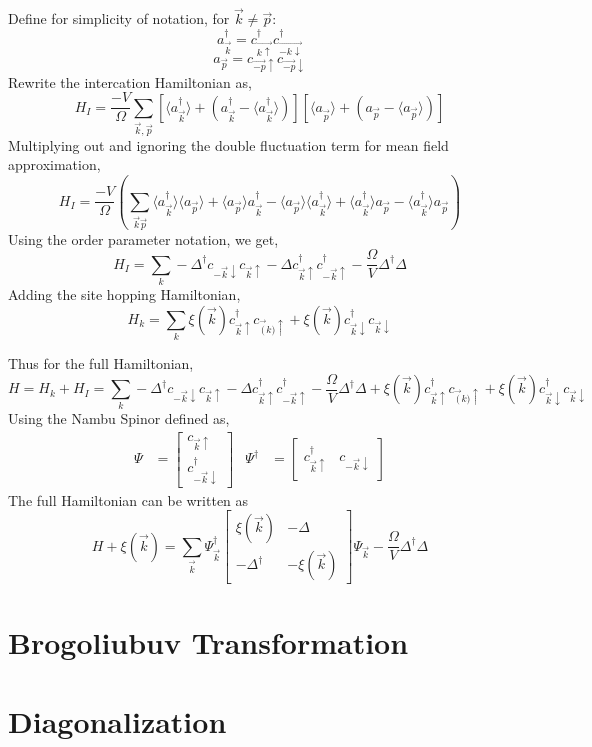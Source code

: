 \documentclass{article}
\begin{document}
Define for simplicity of notation, for $ \vec{k} \neq \vec{p}$:
 $$ a^{\dagger}_{\vec{k}} = c^{\dagger}_{\vec{k \uparrow}} c^{\dagger}_{\vec{-k \downarrow}}$$
 $$ a_{\vec{p}} = c_{\vec{-p}\uparrow}c_{\vec{-p}\downarrow}$$
Rewrite the intercation Hamiltonian as,
$$H_I = \frac{-V}{\Omega} \sum_{\vec{k}, \vec{p}}
  \left [ \langle a^{\dagger}_{\vec{k}} \rangle +
   \left( a^{\dagger}_{\vec{k}} - \langle a^{\dagger}_{\vec{k}} \rangle \right) \right]
  \left [ \langle a^{}_{\vec{p}} \rangle +
    \left( a_{\vec{p}} - \langle a_{\vec{p}} \rangle \right) \right ]
  $$
Multiplying out and ignoring the double fluctuation term for mean field approximation,
$$H_I = \frac{-V}{\Omega} \left(
  \sum_{\vec{k}\vec{p}}
    \langle a^{\dagger}_{\vec{k}}\rangle \langle a_{\vec{p}} \rangle +
      \langle   a_{\vec{p}}\rangle a^{\dagger}_{\vec{k}} -
        \langle  a_{\vec{p}}\rangle \langle a^{\dagger}_{\vec{k}} \rangle +
          \langle a^{\dagger}_{\vec{k}}\rangle a_{\vec{p}}-
           \langle a^{\dagger}_{\vec{k}}\rangle a_{\vec{p}}
\right)
$$
Using the order parameter notation, we get,
$$ H_I = \sum_{k} -\Delta^{\dagger}c_{-\vec{k}\downarrow}c_{\vec{k}\uparrow}
        -\Delta c^{\dagger}_{\vec{k}\uparrow}c^{\dagger}_{-\vec{k}\uparrow}
        -\frac{\Omega}{V}\Delta^{\dagger}\Delta
$$
Adding the site hopping Hamiltonian,
$$ H_k = \sum_{k} \xi(\vec{k})c^{\dagger}_{\vec{k}\uparrow}c_{\vec(k)\uparrow} +
\xi(\vec{k})c^{\dagger}_{\vec{k} \downarrow}c_{\vec{k}\downarrow}$$

Thus for the full Hamiltonian,
$$ H = H_k + H_I =  \sum_{k} -\Delta^{\dagger}c_{-\vec{k}\downarrow}c_{\vec{k}\uparrow}
        -\Delta c^{\dagger}_{\vec{k}\uparrow}c^{\dagger}_{-\vec{k}\uparrow}
        -\frac{\Omega}{V}\Delta^{\dagger}\Delta +
        \xi(\vec{k})c^{\dagger}_{\vec{k}\uparrow}c_{\vec(k)\uparrow} +
        \xi(\vec{k})c^{\dagger}_{\vec{k} \downarrow}c_{\vec{k}\downarrow}
        $$
  Using the Nambu Spinor defined as,
  \begin{equation}
    \begin{split}
      \Psi &=
      \begin{bmatrix}
        c_{\vec{k}\uparrow} \\
        c^{\dagger}_{-\vec{k} \downarrow}
      \end{bmatrix}
    \end{split}
    \begin{split}
      \Psi^{\dagger} &=
      \begin{bmatrix}
        c^{\dagger}_{\vec{k}\uparrow}  & c_{-\vec{k}\downarrow}
      \end{bmatrix}
    \end{split}
  \end{equation}
The full Hamiltonian can be written as
$$
H + \xi(\vec{k}) = \sum_{\vec{k}} \Psi^{\dagger}_{\vec{k}}
\begin{bmatrix}
  \xi(\vec{k}) & -\Delta \\
  -\Delta^\dagger & -\xi(\vec{k})
\end{bmatrix}\Psi_{\vec{k}} -\frac{\Omega}{V}\Delta^{\dagger}\Delta
$$
\section{Brogoliubuv Transformation}

\section{Diagonalization}
\end{document}
